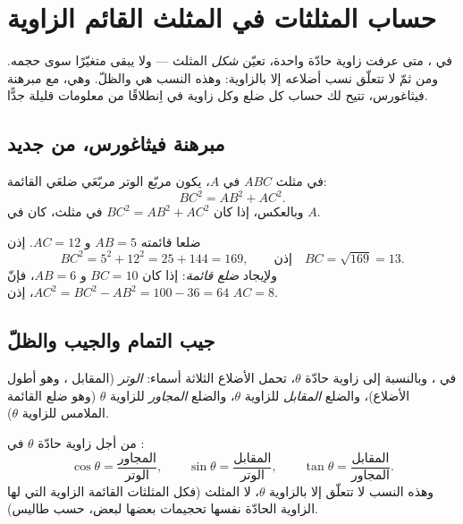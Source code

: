 \chapter{حساب المثلثات في المثلث القائم الزاوية}\label{ch:g9:trig}

في ، متى عرفت زاوية حادّة واحدة، تعيّن
\emph{شكل} المثلث --- ولا يبقى متغيّرًا سوى حجمه. ومن ثمّ لا
تتعلّق نسب أضلاعه إلا بالزاوية: وهذه النسب هي 
 والظلّ. وهي، مع مبرهنة فيثاغورس، تتيح لك حساب كل
ضلع وكل زاوية في  اِنطلاقًا من معلومات قليلة
جدًّا.

\section{مبرهنة فيثاغورس، من جديد}

\begin{theorem}[فيثاغورس]\label{thm:g9:trig:pythagoras}
في مثلث $ABC$  في $A$، يكون مربّع الوتر
 مربّعَي ضلعَي القائمة:
\[
BC^2 = AB^2 + AC^2 .
\]
وبالعكس، إذا كان $BC^2 = AB^2 + AC^2$ في مثلث، كان  في $A$.
\end{theorem}
\admitted

\begin{example}\label{ex:g9:trig:pythagoras}
 ضلعا قائمته $AB = 5$ و $AC = 12$. إذن
\[
BC^2 = 5^2 + 12^2 = 25 + 144 = 169,
\qquad\text{إذن}\quad BC = \sqrt{169} = 13 .
\]
ولإيجاد \emph{ضلع قائمة}: إذا كان $BC = 10$ و $AB = 6$، فإنّ
$AC^2 = BC^2 - AB^2 = 100 - 36 = 64$، إذن $AC = 8$.
\end{example}

\section{جيب التمام والجيب والظلّ}

في ، وبالنسبة إلى زاوية حادّة $\theta$، تحمل
الأضلاع الثلاثة أسماء: \emph{الوتر} (المقابل ، وهو
أطول الأضلاع)، والضلع \emph{المقابل} للزاوية $\theta$، والضلع
\emph{المجاور} للزاوية $\theta$ (وهو ضلع القائمة الملامس
للزاوية $\theta$).

\begin{definition}\label{def:g9:trig:ratios}
من أجل زاوية حادّة $\theta$ في :
\[
\cos\theta = \frac{\text{المجاور}}{\text{الوتر}},
\qquad
\sin\theta = \frac{\text{المقابل}}{\text{الوتر}},
\qquad
\tan\theta = \frac{\text{المقابل}}{\text{المجاور}} .
\]
وهذه النسب لا تتعلّق إلا
بالزاوية $\theta$، لا  المثلث (فكل المثلثات القائمة الزاوية
التي لها الزاوية الحادّة نفسها تحجيمات بعضها لبعض، حسب طاليس).
\end{definition}

